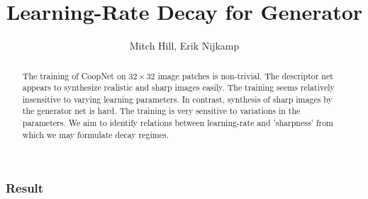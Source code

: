 \documentclass[letter]{article}
\title{Learning-Rate Decay for Generator}
\author{Mitch Hill, Erik Nijkamp}
\begin{document}
\maketitle

\begin{abstract}
The training of CoopNet on $32\times32$ image patches is non-trivial. The descriptor net appears to synthesize realistic and sharp images easily. The training seems relatively insensitive to varying learning parameters. In contrast, synthesis of sharp images by the generator net is hard. The training is very sensitive to variations in the parameters. We aim to identify relations between learning-rate and 'sharpness' from which we may formulate decay regimes.
\end{abstract}

\subsubsection*{Result}
\end{document}
